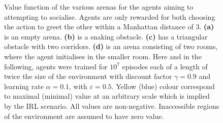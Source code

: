 \documentclass{article}
\begin{document}
\begin{figure}[!ht]
\centering
{}
\caption{Value function of the various arenas for the agents aiming to attempting to socialise. Agents are only rewarded for both choosing the action to greet the other within a Manhattan distance of 3. 
\textbf{(a)} is an empty arena. \textbf{(b)} is a snaking obstacle. \textbf{(c)} has a triangular obstacle with two corridors. \textbf{(d)} is an arena consisting of two rooms, where the agent initialises in the smaller room.\label{twohi}
Here and in the following, agents were trained for $10^7$ episodes each of a length of 
twice the size of the environment with discount factor $\gamma=0.9$ and 
learning rate $\alpha=0.1$, with $\varepsilon=0.5$.
	Yellow (blue) colour correspond to maximal (minimal) value at an 
arbitrary scale which is implied by the IRL scenario. 
	All values are non-negative. Inaccessible regions of the environment 
are assumed to have zero value.}
\end{figure}
\clearpage



\end{document}
